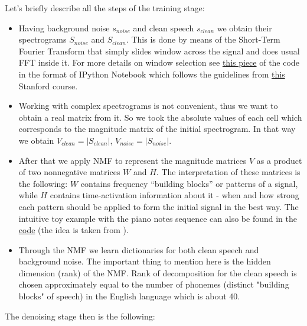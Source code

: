 \documentclass[11pt]{article}
\begin{document}
Let’s briefly describe all the steps of the training stage:
\begin{itemize}
  \item Having background noise $s_{noise}$ and clean speech $s_{clean}$ we obtain their spectrograms $S_{noise}$ and $S_{clean}$. This is done by means of the Short-Term Fourier Transform that simply slides window across the signal and does usual FFT inside it. For more details on window selection see \href{https://github.com/elejke/CNMF-ASR/blob/master/code/Denoising_Demo.ipynb}{this piece} of the code in the format of IPython Notebook which follows the guidelines from \href{https://ccrma.stanford.edu/~jos/parshl/Choice_Hop_Size.html}{this} Stanford course.
  \item Working with complex spectrograms is not convenient, thus we want to obtain a real matrix from it. So we took the absolute values of each cell which corresponds to the magnitude matrix of the initial spectrogram. In that way we obtain $V_{clean} = |S_{clean}|$, $V_{noise} = |S_{noise}|$.
  \item After that we apply NMF to represent the magnitude matrices $V$ as a product of two nonnegative matrices $W$ and $H$. The interpretation of these matrices is the following: $W$ contains frequency “building blocks” or patterns of a signal, while $H$ contains time-activation information about it - when and how strong each pattern should be applied to form the initial signal in the best way. The intuitive toy example with the piano notes sequence can also be found in the \href{https://github.com/elejke/CNMF-ASR/blob/master/code/Piano_Example.ipynb}{code} (the idea is taken from \cite{smaragdis}).
  \item Through the NMF we learn dictionaries for both clean speech and background noise. The important thing to mention here is the hidden dimension (rank) of the NMF. Rank of decomposition for the clean speech is chosen approximately equal to the number of phonemes (distinct "building blocks" of speech) in the English language which is about 40.
\end{itemize}
The denoising stage then is the following:
\end{document}
